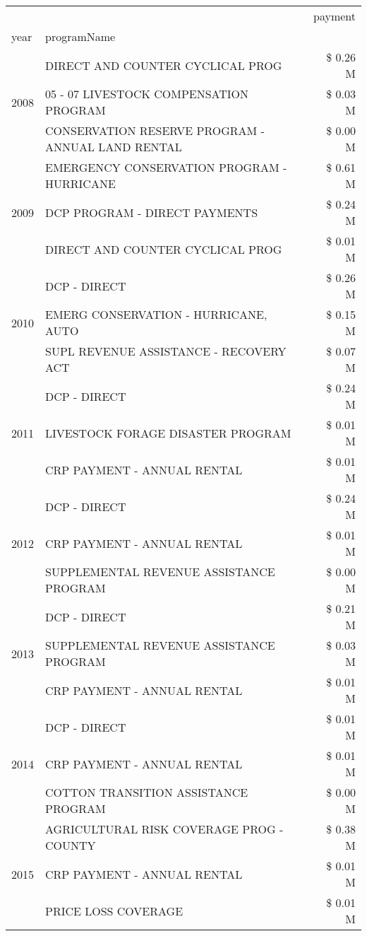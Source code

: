 \begin{tabular}{llr}
\toprule
 &  & payment \\
year & programName &  \\
\midrule
\multirow[t]{3}{*}{2008} & DIRECT AND COUNTER CYCLICAL PROG & \$ 0.26 M \\
 & 05 - 07 LIVESTOCK COMPENSATION PROGRAM & \$ 0.03 M \\
 & CONSERVATION RESERVE PROGRAM - ANNUAL LAND RENTAL & \$ 0.00 M \\
\cline{1-3}
\multirow[t]{3}{*}{2009} & EMERGENCY CONSERVATION PROGRAM - HURRICANE & \$ 0.61 M \\
 & DCP PROGRAM - DIRECT PAYMENTS & \$ 0.24 M \\
 & DIRECT AND COUNTER CYCLICAL PROG & \$ 0.01 M \\
\cline{1-3}
\multirow[t]{3}{*}{2010} & DCP - DIRECT & \$ 0.26 M \\
 & EMERG CONSERVATION - HURRICANE, AUTO & \$ 0.15 M \\
 & SUPL REVENUE ASSISTANCE - RECOVERY ACT & \$ 0.07 M \\
\cline{1-3}
\multirow[t]{3}{*}{2011} & DCP - DIRECT & \$ 0.24 M \\
 & LIVESTOCK FORAGE DISASTER PROGRAM & \$ 0.01 M \\
 & CRP PAYMENT - ANNUAL RENTAL & \$ 0.01 M \\
\cline{1-3}
\multirow[t]{3}{*}{2012} & DCP - DIRECT & \$ 0.24 M \\
 & CRP PAYMENT - ANNUAL RENTAL & \$ 0.01 M \\
 & SUPPLEMENTAL REVENUE ASSISTANCE PROGRAM & \$ 0.00 M \\
\cline{1-3}
\multirow[t]{3}{*}{2013} & DCP - DIRECT & \$ 0.21 M \\
 & SUPPLEMENTAL REVENUE ASSISTANCE PROGRAM & \$ 0.03 M \\
 & CRP PAYMENT - ANNUAL RENTAL & \$ 0.01 M \\
\cline{1-3}
\multirow[t]{3}{*}{2014} & DCP - DIRECT & \$ 0.01 M \\
 & CRP PAYMENT - ANNUAL RENTAL & \$ 0.01 M \\
 & COTTON TRANSITION ASSISTANCE PROGRAM & \$ 0.00 M \\
\cline{1-3}
\multirow[t]{3}{*}{2015} & AGRICULTURAL RISK COVERAGE PROG - COUNTY & \$ 0.38 M \\
 & CRP PAYMENT - ANNUAL RENTAL & \$ 0.01 M \\
 & PRICE LOSS COVERAGE & \$ 0.01 M \\
\cline{1-3}

\end{tabular}
